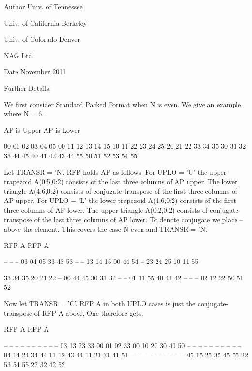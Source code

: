 \begin{DoxyAuthor}{Author}
Univ. of Tennessee 

Univ. of California Berkeley 

Univ. of Colorado Denver 

N\+A\+G Ltd. 
\end{DoxyAuthor}
\begin{DoxyDate}{Date}
November 2011 
\end{DoxyDate}
\begin{DoxyParagraph}{Further Details\+: }
\begin{DoxyVerb}  We first consider Standard Packed Format when N is even.
  We give an example where N = 6.

      AP is Upper             AP is Lower

   00 01 02 03 04 05       00
      11 12 13 14 15       10 11
         22 23 24 25       20 21 22
            33 34 35       30 31 32 33
               44 45       40 41 42 43 44
                  55       50 51 52 53 54 55


  Let TRANSR = 'N'. RFP holds AP as follows:
  For UPLO = 'U' the upper trapezoid A(0:5,0:2) consists of the last
  three columns of AP upper. The lower triangle A(4:6,0:2) consists of
  conjugate-transpose of the first three columns of AP upper.
  For UPLO = 'L' the lower trapezoid A(1:6,0:2) consists of the first
  three columns of AP lower. The upper triangle A(0:2,0:2) consists of
  conjugate-transpose of the last three columns of AP lower.
  To denote conjugate we place -- above the element. This covers the
  case N even and TRANSR = 'N'.

         RFP A                   RFP A

                                -- -- --
        03 04 05                33 43 53
                                   -- --
        13 14 15                00 44 54
                                      --
        23 24 25                10 11 55

        33 34 35                20 21 22
        --
        00 44 45                30 31 32
        -- --
        01 11 55                40 41 42
        -- -- --
        02 12 22                50 51 52

  Now let TRANSR = 'C'. RFP A in both UPLO cases is just the conjugate-
  transpose of RFP A above. One therefore gets:


           RFP A                   RFP A

     -- -- -- --                -- -- -- -- -- --
     03 13 23 33 00 01 02    33 00 10 20 30 40 50
     -- -- -- -- --                -- -- -- -- --
     04 14 24 34 44 11 12    43 44 11 21 31 41 51
     -- -- -- -- -- --                -- -- -- --
     05 15 25 35 45 55 22    53 54 55 22 32 42 52



\end{DoxyVerb}
\end{DoxyParagraph}
